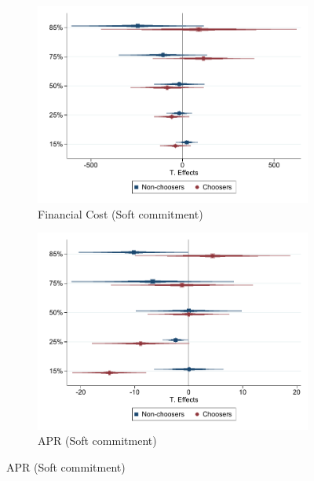 \documentclass[oneside,11pt]{article}
\begin{document}
\begin{figure}[H]
\begin{center}
\begin{subfigure}{.45\textwidth}
      \caption{Financial Cost (Soft commitment)}
        \centering
        \includegraphics[width=\textwidth]{Figuras/qreg_soft_fc_admin.pdf}
    \end{subfigure}
     \begin{subfigure}{0.45\textwidth}
      \caption{APR (Soft commitment)}
       \centering
      \includegraphics[width=\textwidth]{Figuras/qreg_soft_apr.pdf}
    \end{subfigure}    
    \end{center}
        \scriptsize

\end{figure}
\end{document}
